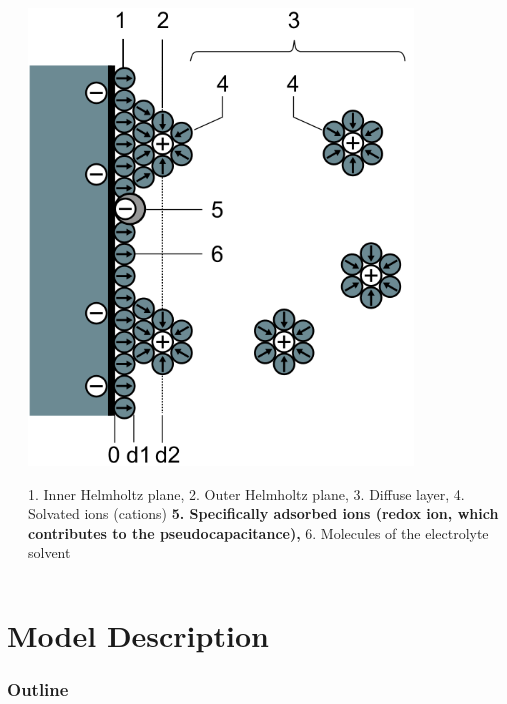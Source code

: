 \documentclass[10pt,xcolor=dvipsnames,compress]{beamer}
\begin{document}
\begin{frame}
\begin{columns}[T]
\begin{column}[T]{5.5cm}
\begin{block}{}
\begin{itemize}
\end{itemize}
\end{block}
     \end{column}
     \begin{column}[T]{5cm} %
	\includegraphics[trim = 0mm 0mm 0mm 0mm, clip, width=0.8\textwidth]{figs/double-layer.png}\\
\begin{footnotesize}
	 1. Inner Helmholtz plane, 
	 2. Outer Helmholtz plane, 
	 3. Diffuse layer, 
	 4. Solvated ions (cations) 
	 \textbf{5. Specifically adsorbed ions (redox ion, which contributes to the pseudocapacitance),} 
	 6. Molecules of the electrolyte solvent
\end{footnotesize}
     \end{column}
\end{columns}



\vfill
\end{frame}


\section{Model Description}
\begin{frame}
\frametitle{Outline}
\vfill

\vspace{0.7in}
\vspace{0.7in}

\vfill
\end{frame}
\end{document}
